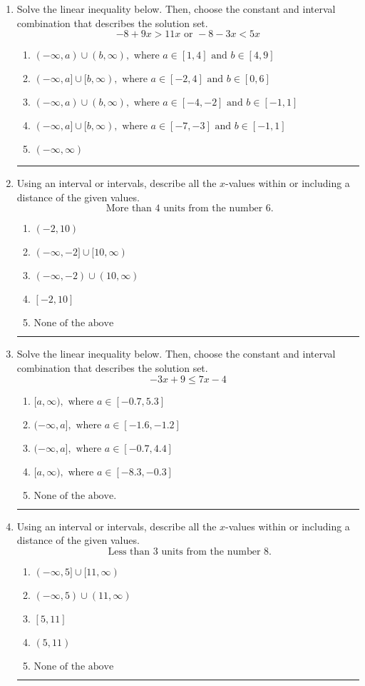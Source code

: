 \documentclass[14pt]{extbook}
\newcommand{\litem}[1]{\item#1\hspace*{-1cm}\rule{\textwidth}{0.4pt}}
\begin{document}
\begin{enumerate}
\litem{
Solve the linear inequality below. Then, choose the constant and interval combination that describes the solution set.\[ -8 + 9 x > 11 x \text{ or } -8 - 3 x < 5 x \]\begin{enumerate}[label=\Alph*.]
\item \( (-\infty, a) \cup (b, \infty), \text{ where } a \in [1, 4] \text{ and } b \in [4, 9] \)
\item \( (-\infty, a] \cup [b, \infty), \text{ where } a \in [-2, 4] \text{ and } b \in [0, 6] \)
\item \( (-\infty, a) \cup (b, \infty), \text{ where } a \in [-4, -2] \text{ and } b \in [-1, 1] \)
\item \( (-\infty, a] \cup [b, \infty), \text{ where } a \in [-7, -3] \text{ and } b \in [-1, 1] \)
\item \( (-\infty, \infty) \)

\end{enumerate} }
\litem{
Using an interval or intervals, describe all the $x$-values within or including a distance of the given values.\[ \text{ More than } 4 \text{ units from the number } 6. \]\begin{enumerate}[label=\Alph*.]
\item \( (-2, 10) \)
\item \( (-\infty, -2] \cup [10, \infty) \)
\item \( (-\infty, -2) \cup (10, \infty) \)
\item \( [-2, 10] \)
\item \( \text{None of the above} \)

\end{enumerate} }
\litem{
Solve the linear inequality below. Then, choose the constant and interval combination that describes the solution set.\[ -3x + 9 \leq 7x -4 \]\begin{enumerate}[label=\Alph*.]
\item \( [a, \infty), \text{ where } a \in [-0.7, 5.3] \)
\item \( (-\infty, a], \text{ where } a \in [-1.6, -1.2] \)
\item \( (-\infty, a], \text{ where } a \in [-0.7, 4.4] \)
\item \( [a, \infty), \text{ where } a \in [-8.3, -0.3] \)
\item \( \text{None of the above}. \)

\end{enumerate} }
\litem{
Using an interval or intervals, describe all the $x$-values within or including a distance of the given values.\[ \text{ Less than } 3 \text{ units from the number } 8. \]\begin{enumerate}[label=\Alph*.]
\item \( (-\infty, 5] \cup [11, \infty) \)
\item \( (-\infty, 5) \cup (11, \infty) \)
\item \( [5, 11] \)
\item \( (5, 11) \)
\item \( \text{None of the above} \)


\end{enumerate}}
\end{enumerate}
\end{document}
